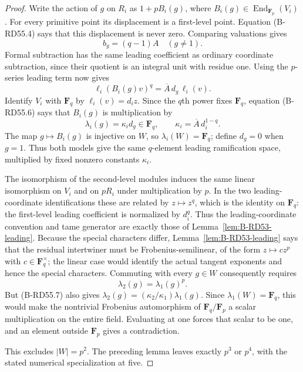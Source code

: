\begin{proof}
Write the action of $g$ on $R_i$ as $1+pB_i(g)$, where
$B_i(g)\in\operatorname{End}_{\mathbf F_p}(V_i)$.
For every primitive point its displacement is a first-level
point. Equation (B-RD55.4) says that this displacement is
never zero. Comparing valuations gives
\[
                    b_g=(q-1)A\quad(g\ne1).             \tag{B-RD55.5}
\]
Formal subtraction has the same leading coefficient as ordinary
coordinate subtraction, since their quotient is an integral
unit with residue one. Using the $p$-series leading term now gives
\[
          \ell_i(B_i(g)v)^q=\overline A\,d_g\,\ell_i(v).
                                                        \tag{B-RD55.6}
\]
Identify $V_i$ with $\mathbf F_q$ by $\ell_i(v)=d_i z$.
Since the $q$th power fixes $\mathbf F_q$, equation (B-RD55.6)
says that $B_i(g)$ is multiplication by
\[
           \lambda_i(g)=\kappa_i d_g\in\mathbf F_q,
           \qquad \kappa_i=\overline A\,d_i^{1-q}.
                                                        \tag{B-RD55.7}
\]
The map $g\mapsto B_i(g)$ is injective on $W$, so
$\lambda_i(W)=\mathbf F_q$; define $d_g=0$ when $g=1$. Thus both models
give the same $q$-element leading ramification space, multiplied
by fixed nonzero constants $\kappa_i$.

The isomorphism of the second-level modules induces the same
linear isomorphism on $V_i$ and on $pR_i$ under multiplication
by $p$. In the two leading-coordinate identifications these
are related by $z\mapsto z^q$, which is the identity on
$\mathbf F_q$: the first-level leading coefficient is normalized
by $d_i^q$. Thus the leading-coordinate convention and tame
generator are exactly those of Lemma~\ref{lem:B-RD53-leading}.
Because the special characters differ,
Lemma~\ref{lem:B-RD53-leading} says that the residual intertwiner
must be Frobenius-semilinear, of the form
$z\mapsto c z^p$ with $c\in\mathbf F_q^\times$; the linear
case would identify the actual tangent exponents and hence
the special characters.
Commuting with every $g\in W$ consequently requires
\[
                 \lambda_2(g)=\lambda_1(g)^p.
\]
But (B-RD55.7) also gives
$\lambda_2(g)=(\kappa_2/\kappa_1)\lambda_1(g)$.
Since $\lambda_1(W)=\mathbf F_q$, this would make the
nontrivial Frobenius automorphism of $\mathbf F_q/\mathbf F_p$
a scalar multiplication on the entire field. Evaluating at
one forces that scalar to be one, and an element outside
$\mathbf F_p$ gives a contradiction.

This excludes $|W|=p^2$. The preceding lemma leaves exactly
$p^3$ or $p^4$, with the stated numerical specialization at five.
\end{proof}

